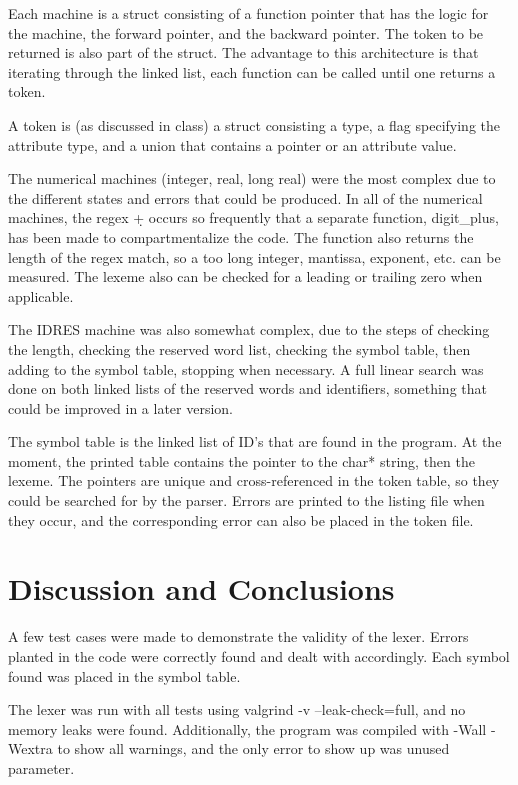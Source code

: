 \documentclass[titlepage]{article}
\begin{document}
Each machine is a struct consisting of a function pointer that has the logic for the machine, the forward pointer, and the backward pointer. The token to be returned is also part of the struct. The advantage to this architecture is that iterating through the linked list, each function can be called until one returns a token.

A token is (as discussed in class) a struct consisting a type, a flag specifying the attribute type, and a union that contains a pointer or an attribute value.

The numerical machines (integer, real, long real) were the most complex due to the different states and errors that could be produced. In all of the numerical machines, the regex \d+ occurs so frequently that a separate function, digit_plus, has been made to compartmentalize the code. The function also returns the length of the regex match, so a too long integer, mantissa, exponent, etc. can be measured. The lexeme also can be checked for a leading or trailing zero when applicable.

The IDRES machine was also somewhat complex, due to the steps of checking the length, checking the reserved word list, checking the symbol table, then adding to the symbol table, stopping when necessary. A full linear search was done on both linked lists of the reserved words and identifiers, something that could be improved in a later version.

The symbol table is the linked list of ID’s that are found in the program. At the moment, the printed table contains the pointer to the char* string, then the lexeme. The pointers are unique and cross-referenced in the token table, so they could be searched for by the parser.
	Errors are printed to the listing file when they occur, and the corresponding error can also be placed in the token file.

\section*{Discussion and Conclusions}
A few test cases were made to demonstrate the validity of the lexer. Errors planted in the code were correctly found and dealt with accordingly. Each symbol found was placed in the symbol table.

The lexer was run with all tests using valgrind -v --leak-check=full, and no memory leaks were found. Additionally, the program was compiled with -Wall -Wextra to show all warnings, and the only error to show up was unused parameter.
\end{document}
